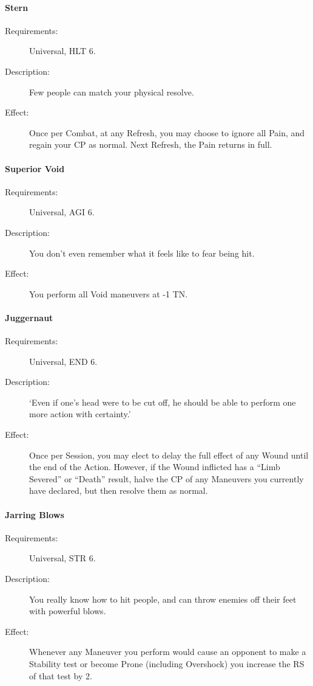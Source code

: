 \documentclass[oneside,11pt,english]{book}
\begin{document}
\paragraph{\label{talent:Stern}Stern}
\begin{description}
\item [Requirements:] Universal, HLT 6. 
\item [Description:] Few people can match your physical resolve. 
\item [Effect:] Once per Combat, at any Refresh, you may choose to ignore all Pain, and regain your CP as normal. Next Refresh, the Pain returns in full. 
  
\end{description}
\paragraph{\label{talent:Superior Void}Superior Void}
\begin{description}
\item [Requirements:] Universal, AGI 6. 
\item [Description:] You don’t even remember what it feels like to fear being hit. 
\item [Effect:] You perform all Void maneuvers at -1 TN. 
  
\end{description}
\paragraph{\label{talent:Juggernaut}Juggernaut}
\begin{description}
\item [Requirements:] Universal, END 6. 
\item [Description:] ‘Even if one’s head were to be cut off, he should be able to perform one more action with certainty.’ 
\item [Effect:] Once per Session, you may elect to delay the full effect of any Wound until the end of the Action. 
  However, if the Wound inflicted has a “Limb Severed” or “Death” result, halve the CP of any Maneuvers 
  you currently have declared, but then resolve them as normal. 
  
\end{description}
\paragraph{\label{talent:Jarring Blows}Jarring Blows}
\begin{description}
\item [Requirements:] Universal, STR 6. 
\item [Description:] You really know how to hit people, and can throw enemies off their feet with powerful blows. 
\item [Effect:] Whenever any Maneuver you perform would cause an opponent to
  make a Stability test or become Prone (including Overshock) you increase the
  RS of that test by 2.  
  
\end{description}
\end{document}
